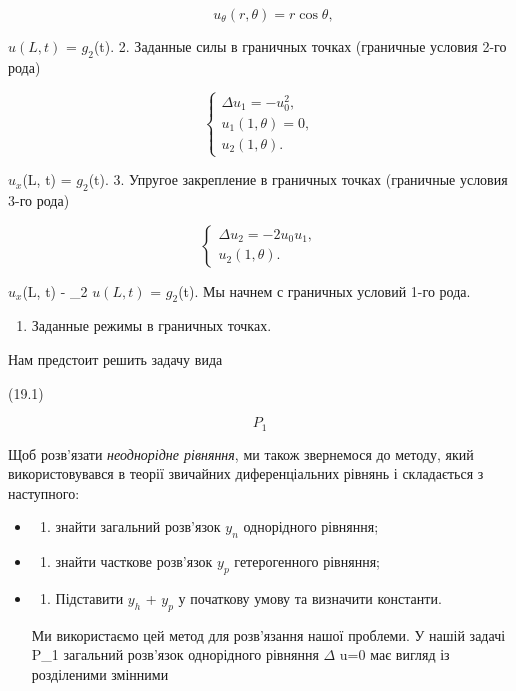 \documentclass[
  ukrainian,
]{article}
\providecommand{\tightlist}{%
  \setlength{\itemsep}{0pt}\setlength{\parskip}{0pt}}
\begin{document}
\[
\qquad u_{\theta}(r, \theta) = r \cos \theta,
\]

\(u(L, t)\) = \(g_2\)(t). 2. Заданные силы в граничных точках (граничные
условия 2-го рода)

\[
\begin{cases} \Delta u_{1} = -u_{0}^{2}, \\ u_{1}(1, \theta) = 0, \\ u_{2}(1, \theta). \end{cases}
\]

\(u_x\)(L, t) = \(g_2\)(t). 3. Упругое закрепление в граничных точках
(граничные условия 3-го рода)

\[
\begin{cases} \Delta u_{2} = -2u_{0}u_{1}, \\ u_{2}(1, \theta). \end{cases}
\]

\(u_x\)(L, t) - \gamma\_2 \(u(L, t)\) = \(g_2\)(t). Мы начнем с
граничных условий 1-го рода.

\begin{enumerate}
\def\labelenumi{\arabic{enumi}.}
\tightlist
\item
  Заданные режимы в граничных точках.
\end{enumerate}

Нам предстоит решить задачу вида

(19.1)

\[
P_{1}
\]

Щоб розв'язати \emph{неоднорідне рівняння}, ми також звернемося до
методу, який використовувався в теорії звичайних диференціальних рівнянь
і складається з наступного:

\begin{itemize}
\item
  \begin{enumerate}
  \def\labelenumi{\arabic{enumi})}
  \tightlist
  \item
    знайти загальний розв'язок \(y_n\) однорідного рівняння;
  \end{enumerate}
\item
  \begin{enumerate}
  \def\labelenumi{\arabic{enumi})}
  \setcounter{enumi}{1}
  \tightlist
  \item
    знайти часткове розв'язок \(y_p\) гетерогенного рівняння;
  \end{enumerate}
\item
  \begin{enumerate}
  \def\labelenumi{\arabic{enumi})}
  \setcounter{enumi}{2}
  \tightlist
  \item
    Підставити \(y_h\) + \(y_p\) у початкову умову та визначити
    константи.
  \end{enumerate}

  Ми використаємо цей метод для розв'язання нашої проблеми. У нашій
  задачі P\_1 загальний розв'язок однорідного рівняння \(\Delta\) u=0
  має вигляд із розділеними змінними
\end{itemize}
\end{document}

